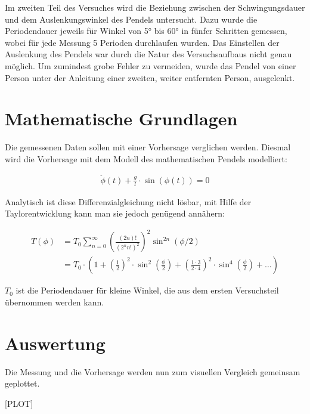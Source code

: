 Im zweiten Teil des Versuches wird die Beziehung zwischen der Schwingungsdauer und dem Auslenkungswinkel des Pendels untersucht.
Dazu wurde die Periodendauer jeweils für Winkel von 5° bis 60° in fünfer Schritten gemessen,
wobei für jede Messung 5 Perioden durchlaufen wurden.
Das Einstellen der Auslenkung des Pendels war durch die Natur des Versuchsaufbaus nicht genau möglich.
Um zumindest grobe Fehler zu vermeiden, wurde das Pendel von einer Person unter der Anleitung einer zweiten, weiter entfernten Person, ausgelenkt.

\section{Mathematische Grundlagen}

Die gemessenen Daten sollen mit einer Vorhersage verglichen werden.
Diesmal wird die Vorhersage mit dem Modell des mathematischen Pendels modelliert:

\begin{align}
	\ddot{\phi}(t) + \frac{g}{l} \cdot \sin ( \phi (t)) = 0
\end{align}

Analytisch ist diese Differenzialgleichung nicht lösbar, mit Hilfe der Taylorentwicklung kann man sie jedoch genügend annähern:

\begin{align}
	T(\phi) & = T_0 \sum_{n=0}^{\infty} \left( \frac{\left(2n\right)!}{\left(2^{n}n!\right)^2} \right)^2 \sin^{2n} \left(\phi /2\right) \\
& = T_0\cdot\left(1+\left(\frac{1}{2}\right)^2 \cdot \sin^2\left(\frac{\phi}{2}\right)+\left(\frac{1\cdot 3}{2\cdot 4}\right)^2 \cdot \sin^4\left(\frac{\phi}{2}\right) + \dots\right)
\end{align}

$T_0$ ist die Periodendauer für kleine Winkel, die aus dem ersten Versuchsteil übernommen werden kann.

\section{Auswertung}

Die Messung und die Vorhersage werden nun zum visuellen Vergleich gemeinsam geplottet.

[PLOT]